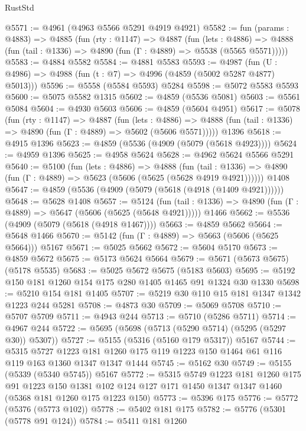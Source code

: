 \begin{lexlean}{RustStd}
\begin{coremodule}
@5571 := @4961 (@4963 @5566 @5291 @4919 @4921)
@5582 := fun (params : @4883) =>
  @4885
    (fun (rty : @1147) =>
    @4887
      (fun (lets : @4886) =>
      @4888 (fun (tail : @1336) => @4890 (fun (Γ : @4889) => @5538 (@5565 @5571)))))
@5583 := @4884 @5582
@5584 := @4881 @5583
@5593 := @4987 (fun (U : @4986) => @4988 (fun (t : @7) => @4996 (@4859 (@5002 @5287 @4877) @5013)))
@5596 := @5558 (@5584 @5593) @5284
@5598 := @5072 @5583 @5593
@5600 := @5075 @5582 @1315
@5602 := @4859 (@5536 @5081)
@5603 := @5561 @5084
@5604 := @4930 @5603
@5606 := @4859 (@5604 @4951)
@5617 := @5078
    (fun (rty : @1147) =>
    @4887
      (fun (lets : @4886) =>
      @4888 (fun (tail : @1336) => @4890 (fun (Γ : @4889) => @5602 (@5606 @5571)))))
    @1396
@5618 := @4915 @1396
@5623 := @4859 (@5536 (@4909 (@5079 (@5618 @4923))))
@5624 := @4959 @1396
@5625 := @4958 @5624
@5628 := @4962 @5624 @5566 @5291
@5640 := @5100
    (fun (lets : @4886) =>
    @4888
      (fun (tail : @1336) => @4890 (fun (Γ : @4889) => @5623 (@5606 (@5625 (@5628 @4919 @4921))))))
    @1408
@5647 := @4859 (@5536 (@4909 (@5079 (@5618 (@4918 (@1409 @4921))))))
@5648 := @5628 @1408
@5657 := @5124
    (fun (tail : @1336) => @4890 (fun (Γ : @4889) => @5647 (@5606 (@5625 (@5648 @4921)))))
    @1466
@5662 := @5536 (@4909 (@5079 (@5618 (@4918 @1467))))
@5663 := @4859 @5662
@5664 := @5648 @1466
@5670 := @5142 (fun (Γ : @4889) => @5663 (@5606 (@5625 @5664))) @5167
@5671 := @5025 @5662
@5672 := @5604 @5170
@5673 := @4859 @5672
@5675 := @5173 @5624 @5664
@5679 := @5671 (@5673 @5675) (@5178 @5535)
@5683 := @5025 @5672 @5675 (@5183 @5603)
@5695 := @5192 @150 @181 @1260 @154 @175 @280 @1405 @1465 @91 @1324 @30 @1330
@5698 := @5210 @154 @181 @1405
@5707 := @5219 @30 @110 @15 @181 @1347 @1342 @1223 @244 @5281
@5708 := @4873 @30
@5709 := @5069 @5708
@5710 := @5707 @5709
@5711 := @4943 @244
@5713 := @5710 (@5286 @5711)
@5714 := @4967 @244
@5722 := @5695 (@5698 (@5713 (@5290 @5714) (@5295 (@5297 @30)) @5307))
@5727 := @5155 (@5316 (@5160 @179 @5317)) @5167
@5744 := @5315
    @5727
    @1223
    @181
    @1260
    @175
    @119
    @1223
    @150
    @1464
    @61
    @116
    @119
    @163
    @1360
    @1347
    @1347
    @1444
@5745 := @5162 @30
@5749 := @5155 (@5339 (@5340 @5745)) @5167
@5772 := @5315
    @5749
    @1223
    @181
    @1260
    @175
    @91
    @1223
    @150
    @1381
    @102
    @124
    @127
    @171
    @1450
    @1347
    @1347
    @1460
    (@5368 @181 @1260 @175 @1223 @150)
@5773 := @5396 @175
@5776 := @5772 (@5376 (@5773 @102))
@5778 := @5402 @181 @175
@5782 := @5776 (@5301 (@5778 @91 @124))
@5784 := @5411 @181 @1260

\end{coremodule}
\end{lexlean}
